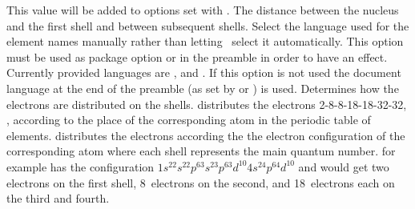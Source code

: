 \documentclass[load-preamble+]{cnltx-doc}
\begin{document}
\begin{options}
  \Default
    This value will be added to options set with .
  \Default{1em}
    The distance between the nucleus and the first shell and between subsequent
    shells.
  \Default
    Select the language used for the element names manually
    rather than letting \BOHR\ select it automatically.  This option must be
    used as package option or in the preamble in order to have an effect.
    Currently provided languages are ,  and
    .  If this option is not used the document language at the
    end of the preamble (as set by  or ) is
    used.
    Determines how the electrons are distributed on the
    shells.   distributes the electrons 2-8-8-18-18-32-32, \ie,
    according to the place of the corresponding atom in the periodic table of
    elements.   distributes the electrons according the the
    electron configuration of the corresponding atom where each shell
    represents the main quantum number.   for example has the
    configuration $1s^22s^22p^63s^23p^63d^{10}4s^24p^64d^{10}$ and would get
    two electrons on the first shell, 8~electrons on the second, and
    18~electrons each on the third and fourth.
\end{options}

\begin{example}
   
\end{example}

\begin{example}
   
\end{example}

\begin{example}
   
\end{example}

\end{document}
